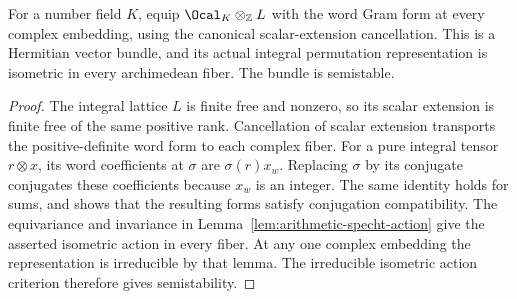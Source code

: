 \begin{lemma}
\label{lem:arithmetic-specht-semistable}
\leanok
For a number field $K$, equip $\Ocal_K\otimes_{\mathbb Z}L$ with the
word Gram form at every complex embedding, using the canonical
scalar-extension cancellation. This is a Hermitian vector bundle, and
its actual integral permutation representation is isometric in every
archimedean fiber. The bundle is semistable.
\end{lemma}
\begin{proof}
The integral lattice $L$ is finite free and nonzero, so its scalar
extension is finite free of the same positive rank. Cancellation of
scalar extension transports the positive-definite word form to each
complex fiber. For a pure integral tensor $r\otimes x$, its word
coefficients at $\sigma$ are $\sigma(r)x_w$. Replacing $\sigma$ by its
conjugate conjugates these coefficients because $x_w$ is an integer.
The same identity holds for sums, and shows that the resulting forms
satisfy conjugation compatibility. The equivariance and invariance in
Lemma~\ref{lem:arithmetic-specht-action} give the asserted isometric
action in every fiber. At any one complex embedding the representation
is irreducible by that lemma. The irreducible isometric action criterion
therefore gives semistability.
\end{proof}

